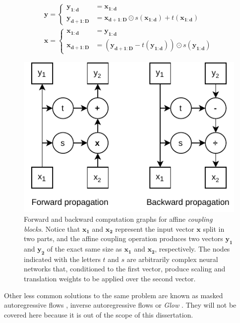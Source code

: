\begin{equation}
\label{eq:affinecouplingblock}
\begin{gathered}
	 \mathbf{y} = \begin{cases} \mathbf{y_{1: d}} & = \mathbf{x_{1: d}} \\
	\mathbf{y_{d+1: D}} & =\mathbf{x_{d+1: D}} \odot s\left(\mathbf{x_{1: d}}\right)+t\left(\mathbf{x_{1: d}}\right)\end{cases} \\
	\mathbf{x} = \begin{cases}
	\mathbf{x_{1: d}} &=\mathbf{y_{1: d}} \\
	\mathbf{x_{d+1: D}} &=\left(\mathbf{y_{d+1: D}}-t\left(\mathbf{y_{1: d}}\right)\right) \odot s\left(\mathbf{y_{1: d}}\right)
	\end{cases}
\end{gathered}
\end{equation}

\begin{figure}
	\centering
	\includegraphics[width=0.7\linewidth]{chapter2/images/affinecouplingblock}
	\caption{Forward and backward computation graphs for affine \textit{coupling blocks}. Notice that $\mathbf{x_1}$ and $\mathbf{x_2}$ represent the input vector $\mathbf{x}$ split in two parts, and the affine coupling operation produces two vectors $\mathbf{y_1}$ and $\mathbf{y_2}$ of the exact same size as $\mathbf{x_1}$ and $\mathbf{x_2}$, respectively. The nodes indicated with the letters $t$ and $s$ are arbitrarily complex neural networks that, conditioned to the first vector, produce scaling and translation weights to be applied over the second vector.}
	\label{fig:affinecouplingblock}
\end{figure}


Other less common solutions to the same problem are known as masked autoregressive flows \autocite{papamakarios2017}, inverse autoregressive flows \autocite{kingma2016} or \textit{Glow} \autocite{kingma2018}. They will not be covered here because it is out of the scope of this dissertation.

